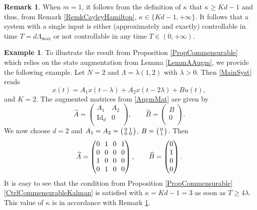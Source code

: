\documentclass[JEP,XML,SOM,Unicode]{cedram}
\newenvironment{smallpmatrix}{\big(\begin{smallmatrix}}{\end{smallmatrix}\big)}
\theoremstyle{plain}
\theoremstyle{definition}
\newtheorem{remk}[theo]{Remark}
\newtheorem{expl}[theo]{Example}
\DeclareMathOperator{\id}{Id}
\begin{document}
\begin{remk}
\label{RemkKappaSingleInput}
When $m = 1$, it follows from the definition of $\kappa$ that $\kappa \geq K d - 1$ and thus, from Remark \ref{RemkCayleyHamilton}, $\kappa \in \{K d - 1, +\infty\}$. It follows that a system with a single input is either (approximately and exactly) controllable in time $T = d \Lambda_{\max}$ or not controllable in any time $T \in (0, +\infty)$.
\end{remk}

\begin{expl}
To illustrate the result from Proposition \ref{PropCommensurable} which relies on the state augmentation from Lemma \ref{LemmAAugm}, we provide the following example. Let $N = 2$ and $\Lambda = \lambda(1, 2)$ with $\lambda > 0$. Then \eqref{MainSyst} reads
\[x(t) = A_1 x(t - \lambda) + A_2 x(t - 2 \lambda) + B u(t),\]
and $K = 2$. The augmented matrices from \eqref{AugmMat} are given by
\[
\widehat A =
\begin{pmatrix}
A_1 & A_2 \\
\id_d & 0 \\
\end{pmatrix}, \qquad \widehat B =
\begin{pmatrix}
B \\ 0 \\
\end{pmatrix}.
\]
We now choose $d = 2$ and $A_1 = A_2 = \begin{smallpmatrix}0 & 1 \\ 0 & 0\\\end{smallpmatrix}$, $B = \begin{smallpmatrix}0 \\ 1 \\\end{smallpmatrix}$. Then
\[\arraycolsep3.5pt
\widehat A =
\begin{pmatrix}
0 & 1 & 0 & 1 \\
0 & 0 & 0 & 0 \\
1 & 0 & 0 & 0 \\
0 & 1 & 0 & 0 \\
\end{pmatrix}, \qquad \widehat B =
\begin{pmatrix}
0 \\
1 \\
0 \\
0 \\
\end{pmatrix}.
\]
It is easy to see that the condition from Proposition \ref{PropCommensurable}\eqref{CtrlCommensurableKalman} is satisfied with $\kappa = K d - 1 = 3$ as soon as $T \geq 4 \lambda$. This value of $\kappa$ is in accordance with Remark \ref{RemkKappaSingleInput}.
\end{expl}
\end{document}
